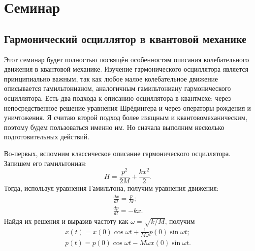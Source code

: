 \section{Семинар \thesection}\label{sem:oscillator}
\subsection{Гармонический осциллятор в квантовой механике}
Этот семинар будет полностью посвящён особенностям описания колебательного
движения в квантовой механике. Изучение гармонического осциллятора является
принципиально важным, так как любое малое колебательное движение описывается
гамильтонианом, аналогичным гамильтониану гармонического осциллятора. Есть два
подхода к описанию осциллятора в квантмехе: через непосредственное решение
уравнения Шрёдингера и через операторы рождения и уничтожения. Я считаю второй
подход более изящным и квантовомеханическим, поэтому будем пользоваться именно
им. Но сначала выполним несколько подготовительных действий.

Во-первых, вспомним классическое описание гармонического осциллятора. Запишем
его гамильтониан:
\[
  H = \frac{p^2}{2M} + \frac{kx^2}{2}.
\]
Тогда, используя уравнения Гамильтона, получим уравнения движения:
\begin{gather*}
  \frac{dx}{dt} = \frac{p}{M}; \\
  \frac{dp}{dt} = -kx.
\end{gather*}
Найдя их решения и выразив частоту как $\omega = \sqrt{k/M}$, получим
\begin{gather*}
  x(t) = x(0)\cos\omega t + \frac{1}{M\omega}p(0)\sin\omega t; \\
  p(t) = p(0)\cos \omega t - M\omega x(0) \sin\omega t.
\end{gather*}

